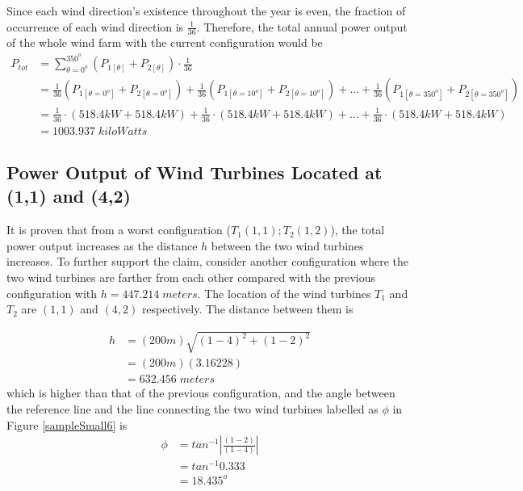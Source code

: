     Since each wind direction's existence throughout the year is even, the fraction of occurrence of each wind direction is $\frac{1}{36}$. Therefore, the total annual power output of the whole wind farm with the current configuration would be
    \begin{align*}
        P_{tot}
        &= \sum_{\theta=0^o}^{350^o} \left( P_{1[\theta]} + P_{2[\theta]} \right) \cdot \frac{1}{36} \\
        &= \frac{1}{36}\left( P_{1[\theta=0^o]} + P_{2[\theta=0^o]} \right) + \frac{1}{36}\left( P_{1[\theta=10^o]} + P_{2[\theta=10^o]} \right) +...+ \frac{1}{36}\left( P_{1[\theta=350^o]} + P_{2[\theta=350^o]} \right) \\
        &= \frac{1}{36}\cdot\left( 518.4kW + 518.4kW \right) + \frac{1}{36}\cdot\left( 518.4kW + 518.4kW \right) +...+ \frac{1}{36}\cdot\left(  518.4kW + 518.4kW \right) \\
        &=1003.937\;kiloWatts
    \end{align*}

\subsection{Power Output of Wind Turbines Located at (1,1) and (4,2)}   
    It is proven that from a worst configuration ($T_1(1,1); T_2(1,2)$), the total power output increases as the distance $h$ between the two wind turbines increases. To further support the claim, consider another configuration where the two wind turbines are farther from each other compared with the previous configuration with $h=447.214\;meters$. The location of the wind turbines $T_1$ and $T_2$ are $(1,1)$ and $(4,2)$ respectively. The distance between them is
    
    \begin{align*}
    	h
    	&=(200m)\sqrt{(1-4)^2+(1-2)^2} \\
    	&=(200m)(3.16228) \\
    	&=632.456\;meters
    \end{align*}
    which is higher than that of the previous configuration, and the angle between the reference line and the line connecting the two wind turbines labelled as $\phi$ in Figure \ref{sampleSmall6} is
    \begin{align*}
    	\phi
    	&=tan^{-1}\left| \frac{(1-2)}{(1-4)} \right| \\
    	&=tan^{-1} 0.333 \\
    	&=18.435^o
    \end{align*}
    
